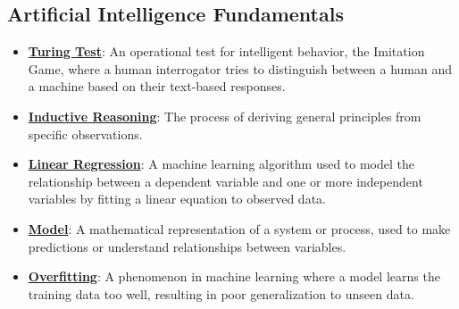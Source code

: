\documentclass{article}%
\begin{document}
\subsection{Artificial Intelligence Fundamentals}%
\label{subsec:ArtificialIntelligenceFundamentals}%
\begin{itemize}[leftmargin=*]%
\item \href{https://purdue.brightspace.com/d2l/common/assets/pdfjs-d2l-dist/1.0.14-legacy/web/viewer.html?file=%2Fcontent%2Fenforced%2F1095467-wl.202510.CS.24300.001%2F02L2-Intro.pdf%3Fou%3D1095467&lang=en-us&container=d2l-fileviewer-rendered-pdf&fullscreen=d2l-fileviewer-rendered-pdf-dialog&height=667#page=6}{\textbf{Turing Test}}: An operational test for intelligent behavior, the Imitation Game, where a human interrogator tries to distinguish between a human and a machine based on their text-based responses.%
\item \href{https://purdue.brightspace.com/d2l/common/assets/pdfjs-d2l-dist/1.0.14-legacy/web/viewer.html?file=%2Fcontent%2Fenforced%2F1095467-wl.202510.CS.24300.001%2F05L2-ML Basics.pdf%3Fou%3D1095467&lang=en-us&container=d2l-fileviewer-rendered-pdf&fullscreen=d2l-fileviewer-rendered-pdf-dialog&height=667#page=3}{\textbf{Inductive Reasoning}}: The process of deriving general principles from specific observations.%
\item \href{https://purdue.brightspace.com/d2l/common/assets/pdfjs-d2l-dist/1.0.14-legacy/web/viewer.html?file=%2Fcontent%2Fenforced%2F1095467-wl.202510.CS.24300.001%2F05L2-ML Basics.pdf%3Fou%3D1095467&lang=en-us&container=d2l-fileviewer-rendered-pdf&fullscreen=d2l-fileviewer-rendered-pdf-dialog&height=667#page=6}{\textbf{Linear Regression}}: A machine learning algorithm used to model the relationship between a dependent variable and one or more independent variables by fitting a linear equation to observed data.%
\item \href{https://purdue.brightspace.com/d2l/common/assets/pdfjs-d2l-dist/1.0.14-legacy/web/viewer.html?file=%2Fcontent%2Fenforced%2F1095467-wl.202510.CS.24300.001%2F05L2-ML Basics.pdf%3Fou%3D1095467&lang=en-us&container=d2l-fileviewer-rendered-pdf&fullscreen=d2l-fileviewer-rendered-pdf-dialog&height=667#page=5}{\textbf{Model}}: A mathematical representation of a system or process, used to make predictions or understand relationships between variables.%
\item \href{https://purdue.brightspace.com/d2l/common/assets/pdfjs-d2l-dist/1.0.14-legacy/web/viewer.html?file=%2Fcontent%2Fenforced%2F1095467-wl.202510.CS.24300.001%2F05L2-ML Basics.pdf%3Fou%3D1095467&lang=en-us&container=d2l-fileviewer-rendered-pdf&fullscreen=d2l-fileviewer-rendered-pdf-dialog&height=667#page=14}{\textbf{Overfitting}}: A phenomenon in machine learning where a model learns the training data too well, resulting in poor generalization to unseen data.%

\end{itemize}
\end{document}

